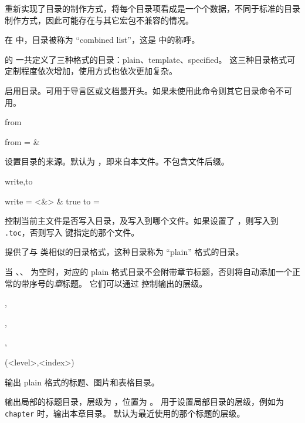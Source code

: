 \documentclass{cusdoc}
\begin{document}
\CusTeX 重新实现了目录的制作方式，将每个目录项看成是一个个数据，不同于标准的目录制作方式，因此可能存在与其它宏包不兼容的情况。

在 \CusTeX 中，目录被称为 “combined list”，这是 \ConTeXt 中的称呼。

\CusTeX 的  一共定义了三种格式的目录：plain、template、specified。
这三种目录格式可定制程度依次增加，使用方式也依次更加复杂。

\begin{function}{\enablecombinedlist}
 启用目录。可用于导言区或文档最开头。如果未使用此命令则其它目录命令不可用。
\end{function}

\begin{keyval}[path=cbl-setup]{from}
  \begin{syntax}
    from =  & \V\jobname
  \end{syntax}
设置目录的来源。默认为 ，即来自本文件。不包含文件后缀。
\end{keyval}

\begin{keyval}[path=cbl-setup]{write,to}
  \begin{syntax}
    write = <&\TTF> & true 
    to    = 
  \end{syntax}
控制当前主文件是否写入目录，及写入到哪个文件。如果设置了 ，则写入到 \texttt{.toc}，否则写入  键指定的那个文件。
\end{keyval}

 提供了与  类相似的目录格式，这种目录称为 ``plain'' 格式的目录。

当 、、 为空时，对应的 
plain 格式目录不会附带章节标题，否则将自动添加一个正常的带序号的\emph{章}标题。
它们可以通过  控制输出的层级。

\begin{function}{\tableofcontents,\listoffigures,\listoftables,\localtableofcontents}
\begin{syntax}
  \V\tableofcontents      {}
  \V\localtableofcontents {} \string(<level>,<index>\string)
\end{syntax}
输出 plain 格式的标题、图片和表格目录。

 输出局部的标题目录，层级为 ，位置为 。
 用于设置局部目录的层级，例如为 \texttt{chapter} 时，输出本章目录。
默认为最近使用的那个标题的层级。
\end{function}
\end{document}
